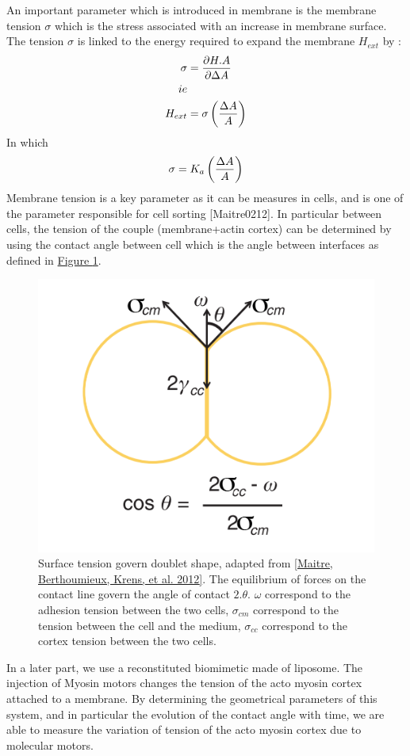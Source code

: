 \documentclass[A4paperpaper,11pt,english]{sphinxmanual}
\begin{document}
An important parameter which is introduced in membrane is the  membrane tension
\(\sigma\) which is the stress associated with an increase in membrane surface.
The tension \(\sigma\) is linked to the energy required to expand the membrane \(H_{ext}\) by :
\begin{gather}
\begin{split}\sigma &= \frac {\partial H.A} {\partial \Delta A} \\
ie &\\
H_{ext} &= \sigma\left( \frac {\Delta A} A \right)\end{split}\notag
\end{gather}
In which
\begin{gather}
\begin{split}\sigma =  K_a \left( \frac {\Delta A} A \right)\end{split}\notag
\end{gather}
Membrane tension is a key parameter as it can be measures in cells, and is one
of the parameter responsible for cell sorting {[}Maitre0212{]}. In particular
between cells, the tension of the couple (membrane+actin cortex) can be
determined by using the contact angle between cell which is the angle between
interfaces as defined in \hyperref[parts/part1:fig-tension-cell]{Figure  \ref*{parts/part1:fig-tension-cell}}.
\begin{figure}[htbp]
\centering
\capstart

\includegraphics[width=0.400\linewidth]{Cell-Surface-tension.png}
\caption{Surface tension govern doublet shape,  adapted from {\hyperref[parts/part1:maitre2012]{{[}Maitre, Berthoumieux, Krens,  et al.  2012{]}}}.
The equilibrium of forces on the contact line govern the angle of contact
\(2.\theta\). \(\omega\) correspond to the adhesion tension between
the two cells, \(\sigma_{cm}\) correspond to the tension between
the cell and  the medium, \(\sigma_{cc}\) correspond to the cortex
tension between the two cells.}\label{parts/part1:fig-tension-cell}\end{figure}

In a later part, we use a reconstituted biomimetic made of liposome. The
injection of Myosin motors changes the tension of the acto myosin cortex
attached to a membrane. By determining the geometrical parameters of this
system, and  in particular the evolution of the contact angle with time, we are
able to measure the variation of tension of the acto myosin cortex due to
molecular motors.
\end{document}
